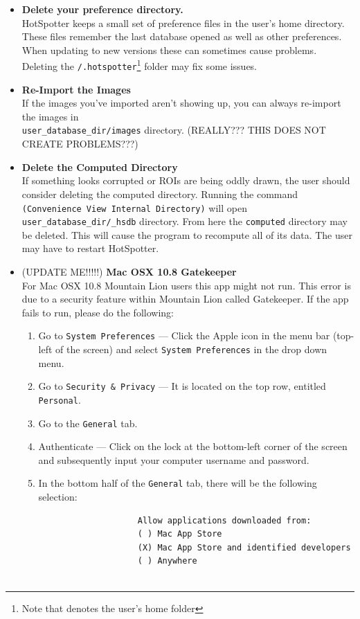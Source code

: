 \documentclass[a4paper,10pt]{article}
\begin{document}
\begin{itemize}
    \item \textbf{Delete your preference directory.}\\
        HotSpotter keeps a small set of preference files in the user's  home directory.
        These files remember the last database opened as well as other
        preferences. When updating to new versions these can sometimes cause
        problems. Deleting the {\tt \texttildelow/.hotspotter}\footnote{Note
            that {\tt \texttildelow} denotes the user's home folder} folder may fix some issues.\\

    \item \textbf{Re-Import the Images}\\
        If the images you've imported aren't showing up, you can always re-import
        the images in\\ {\tt user\_database\_dir/images}
        directory. (REALLY???  THIS DOES NOT CREATE PROBLEMS???)  \\

    \item \textbf{Delete the Computed Directory}\\
        If something looks corrupted or ROIs are being oddly drawn, the user
        should consider deleting the computed directory.  Running  the command 
        {\tt (Convenience \textrightarrow{} View Internal Directory)} will open
        {\tt user\_database\_dir/\_hsdb} directory. From here the
        {\tt computed} directory may be deleted. This will cause the program
        to recompute all of its data. The user may have to restart HotSpotter.\\


    \item (UPDATE ME!!!!!)  \textbf{Mac OSX 10.8 Gatekeeper}\\ For Mac OSX 10.8 Mountain
      Lion users this app might not run.  This error is due to a
      security feature within Mountain Lion called Gatekeeper.  If the
      app fails to run, please do the following:
        \begin{enumerate}
            \item Go to {\tt System Preferences} --- Click the Apple icon in the menu bar (top-left of the screen) and select {\tt System Preferences} in the drop down menu.
            \item Go to {\tt Security \& Privacy} --- It is located on the top row, entitled {\tt Personal}.
            \item Go to the {\tt General} tab.
            \item Authenticate --- Click on the lock at the bottom-left corner of the screen and subsequently input your computer username and password.
            \item In the bottom half of the {\tt General} tab, there will be the following selection:
                \begin{Verbatim}
                    Allow applications downloaded from:
                    ( ) Mac App Store
                    (X) Mac App Store and identified developers
                    ( ) Anywhere


\end{Verbatim}
\end{enumerate}
\end{itemize}
\end{document}
